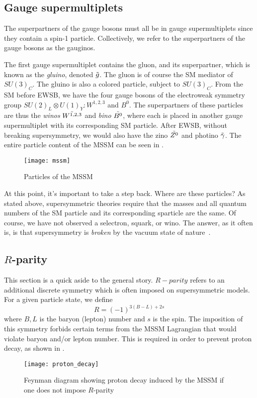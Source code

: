 \subsection{Gauge supermultiplets}

The superpartners of the gauge bosons must all be in gauge supermultiplets since they contain a spin-1 particle.
Collectively, we refer to the superpartners of the gauge bosons as the gauginos.

The first gauge supermultiplet contains the gluon, and its superpartner, which is known as the \textit{gluino}, denoted $\tilde{g}$.
The gluon is of course the SM mediator of $SU(3)_C$.
The gluino is also a colored particle, subject to $SU(3)_C$.
From the SM before EWSB, we have the four gauge bosons of the electroweak symmetry group $SU(2)_L \otimes U(1)_Y: W^{1,2,3}$ and $B^0$.
The superpartners of these particles are thus the \textit{winos} $\tilde{W^{1,2,3}}$ and \textit{bino} $\tilde{B^0}$, where each is placed in another gauge supermultiplet with its corresponding SM particle.
After EWSB, without breaking supersymmetry, we would also have the zino $\tilde{Z^0}$ and photino $\tilde{\gamma}$.
The entire particle content of the MSSM can be seen in .
\begin{figure}[tbp]
\caption{Particles of the MSSM} \label{fig:mssm}
\texttt{[image: mssm]}
\end{figure}

At this point, it's important to take a step back.
Where are these particles?
As stated above, supersymmetric theories require that the masses and all quantum numbers of the SM particle and its corresponding sparticle are the same.
Of course, we have not observed a selectron, squark, or wino.
The answer, as it often is, is that supersymmetry is \textit{broken} by the vacuum state of nature~\cite{susyPrimer}.

\subsection{$R$-parity}\label{sec:r_parity}

This section is a quick aside to the general story.
$R-parity$ refers to an additional discrete symmetry which is often imposed on supersymmetric models.
For a given particle state, we define
\begin{equation}
R = (-1)^{3(B-L) + 2s}
\end{equation}
where $B,L$ is the baryon (lepton) number and $s$ is the spin.
The imposition of this symmetry forbids certain terms from the MSSM Lagrangian that would violate baryon and/or lepton number.
This is required in order to prevent proton decay, as shown in \footnotemark.
\begin{figure}[tbp]
\caption{Feynman diagram showing proton decay induced by the MSSM if one does not impose $R$-parity}\label{fig:proton_decay}
\texttt{[image: proton\_decay]}
\end{figure}

